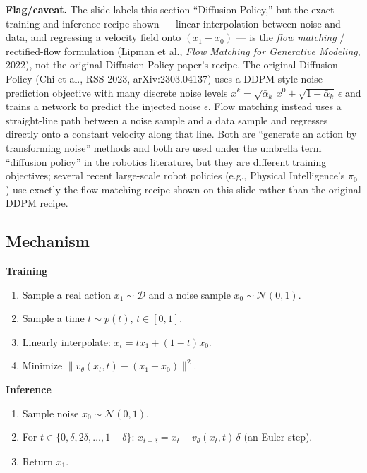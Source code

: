 \documentclass[11pt]{article}
\begin{document}
\textbf{Flag/caveat.} The slide labels this section ``Diffusion Policy,'' but the exact training and inference recipe shown --- linear interpolation between noise and data, and regressing a velocity field onto $(x_1-x_0)$ --- is the \emph{flow matching} / rectified-flow formulation (Lipman et al., \emph{Flow Matching for Generative Modeling}, 2022), not the original Diffusion Policy paper's recipe. The original Diffusion Policy (Chi et al., RSS 2023, arXiv:2303.04137) uses a DDPM-style noise-prediction objective with many discrete noise levels $x^k = \sqrt{\bar\alpha_k}\, x^0 + \sqrt{1-\bar\alpha_k}\,\epsilon$ and trains a network to predict the injected noise $\epsilon$. Flow matching instead uses a straight-line path between a noise sample and a data sample and regresses directly onto a constant velocity along that line. Both are ``generate an action by transforming noise'' methods and both are used under the umbrella term ``diffusion policy'' in the robotics literature, but they are different training objectives; several recent large-scale robot policies (e.g., Physical Intelligence's $\pi_0$) use exactly the flow-matching recipe shown on this slide rather than the original DDPM recipe.

\subsection*{Mechanism}

\textbf{Training}
\begin{enumerate}
\item Sample a real action $x_1 \sim \mathcal{D}$ and a noise sample $x_0 \sim \mathcal{N}(0,1)$.
\item Sample a time $t \sim p(t)$, $t\in[0,1]$.
\item Linearly interpolate: $x_t = t x_1 + (1-t)x_0$.
\item Minimize $\lVert v_\theta(x_t, t) - (x_1 - x_0)\rVert^2$.
\end{enumerate}
\textbf{Inference}
\begin{enumerate}
\item Sample noise $x_0 \sim \mathcal{N}(0,1)$.
\item For $t \in \{0,\delta,2\delta,\dots,1-\delta\}$: $x_{t+\delta} = x_t + v_\theta(x_t,t)\,\delta$ (an Euler step).
\item Return $x_1$.
\end{enumerate}
\end{document}
